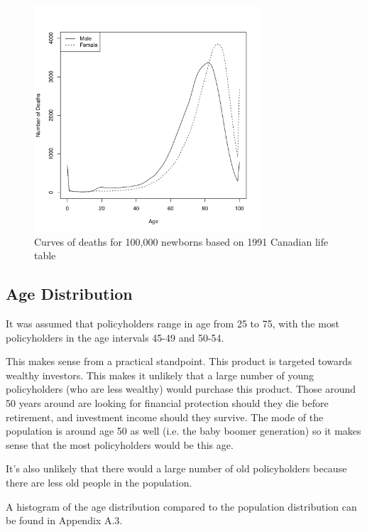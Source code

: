 \documentclass[12pt]{article}
\begin{document}
\begin{figure}[ht]
\begin{center}
\vspace{-12.5mm}
\includegraphics[width=0.75\textwidth]{images/curvedeaths}
\end{center}
\vspace{-2.5mm}
\caption{Curves of deaths for 100,000 newborns based on 1991 Canadian life table}
\label{fig:curvedeaths}
\end{figure}

\subsection{Age Distribution}

It was assumed that policyholders range in age from 25 to 75, with the most policyholders in the age intervals 45-49 and 50-54.

This makes sense from a practical standpoint. This product is targeted towards wealthy investors. This makes it unlikely that a large number of young policyholders (who are less wealthy) would purchase this product. Those around 50 years around are looking for financial protection should they die before retirement, and investment income should they survive. The mode of the population is around age 50 as well (i.e. the baby boomer generation) so it makes sense that the most policyholders would be this age.

It's also unlikely that there would a large number of old policyholders because there are less old people in the population.

A histogram of the age distribution compared to the population distribution can be found in Appendix A.3.
\end{document}
